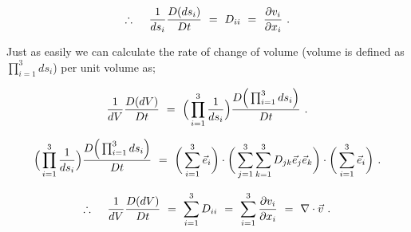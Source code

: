 \documentclass{article}
\begin{document}
\begin{equation} \label{eq:1}
\therefore \hspace{0.425cm} \frac{1}{ds_i} \frac{D ( ds_i )}{D t} \hspace{0.125cm} = \hspace{0.125cm} D_{i i} \hspace{0.125cm} = \hspace{0.125cm} \frac{\partial{v_i}}{\partial{x_i}} \hspace{0.125cm} . 
\end{equation} 

Just as easily we can calculate the rate of change of volume (volume is defined as \begin{math} \prod_{i = 1}^{3} ds_i \end{math}) per unit volume as;

\begin{equation} \label{eq:1}
\frac{1}{dV} \frac{D ( dV )}{D t} \hspace{0.125cm} = \hspace{0.125cm} \Big( \prod_{i = 1}^{3} \frac{1}{ds_i} \Big) \frac{D \Big( \prod_{i = 1}^{3} ds_i \Big)}{D t} \hspace{0.125cm} . 
\end{equation} 

\begin{equation} \label{eq:1}
\Big( \prod_{i = 1}^{3} \frac{1}{ds_i} \Big) \frac{D \Big( \prod_{i = 1}^{3} ds_i \Big)}{D t} \hspace{0.125cm} = \hspace{0.125cm} \bigg( \sum_{i = 1}^{3} \vec{e}_i \bigg) \cdot \bigg( \sum_{j = 1}^{3} \sum_{k = 1}^{3} D_{j k} \vec{e}_j \vec{e}_k \bigg) \cdot \bigg( \sum_{i = 1}^{3} \vec{e}_i \bigg) \hspace{0.125cm} . 
\end{equation} 

\begin{equation} \label{eq:1}
\therefore \hspace{0.425cm} \frac{1}{dV} \frac{D ( dV )}{D t} \hspace{0.125cm} = \hspace{0.125cm} \sum_{i = 1}^{3} D_{i i} \hspace{0.125cm} = \hspace{0.125cm} \sum_{i = 1}^{3} \frac{\partial{v_i}}{\partial{x_i}} \hspace{0.125cm} = \hspace{0.125cm} \nabla \cdot \vec{v} \hspace{0.125cm} . 
\end{equation} 
\end{document}
